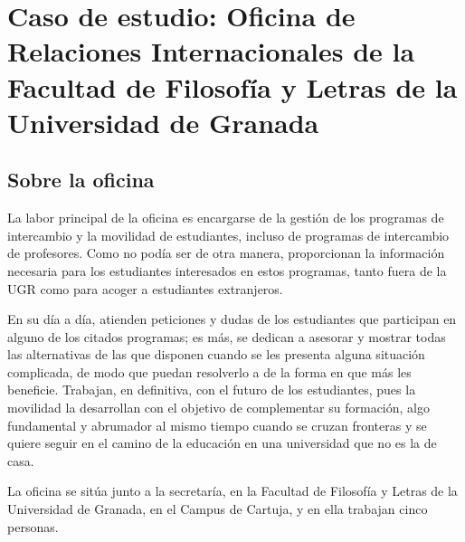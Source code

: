 \section{Caso de estudio: Oficina de Relaciones Internacionales de la Facultad de Filosofía y Letras de la Universidad de Granada}
\subsection{Sobre la oficina}
La labor principal de la oficina es encargarse de la gestión de los programas de intercambio y la movilidad de estudiantes, incluso de programas de intercambio de profesores. Como no podía ser de otra manera, proporcionan la información necesaria para los estudiantes interesados en estos programas, tanto fuera de la UGR como para acoger a estudiantes extranjeros.

En su día a día, atienden peticiones y dudas de los estudiantes que participan en alguno de los citados programas; es más, se dedican a asesorar y mostrar todas las alternativas de las que disponen cuando se les presenta alguna situación complicada, de modo que puedan resolverlo a de la forma en que más les beneficie. Trabajan, en definitiva, con el futuro de los estudiantes, pues la movilidad la desarrollan con el objetivo de complementar su formación, algo fundamental y abrumador al mismo tiempo cuando se cruzan fronteras y se quiere seguir en el camino de la educación en una universidad que no es la de casa.

La oficina se sitúa junto a la secretaría, en la Facultad de Filosofía y Letras de la Universidad de Granada, en el Campus de Cartuja, y en ella trabajan cinco personas. 